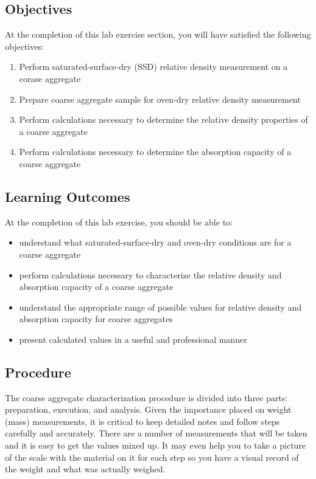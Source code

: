 \documentclass[12pt]{article}
\begin{document}
\subsection{Objectives}
\label{ssec:headingscap}
At the completion of this lab exercise section, you will have satisfied the following objectives:
\begin{enumerate}
    \item Perform saturated-surface-dry (SSD) relative density measurement on a corase aggregate
    \item Prepare coarse aggregate sample for oven-dry relative density measurement
    \item Perform calculations necessary to determine the relative density properties of a coarse aggregate
    \item Perform calculations necessary to determine the absorption capacity of a coarse aggregate
\end{enumerate}

\subsection{Learning Outcomes}
At the completion of this lab exercise, you should be able to:
\begin{itemize}
    \item understand what saturated-surface-dry and oven-dry conditions are for a coarse aggregate
    \item perform calculations necessary to characterize the relative density and absorption capacity of a coarse aggregate
    \item understand the appropriate range of possible values for relative density and absorption capacity for coarse aggregates
    \item present calculated values in a useful and professional manner
\end{itemize}

\pagebreak
\subsection{Procedure}
The coarse aggregate characterization procedure is divided into three parts: preparation, execution, and analysis. Given the importance placed on weight (mass) measurements, it is critical to keep detailed notes and follow steps carefully and accurately. There are a number of measurements that will be taken and it is easy to get the values mixed up. It may even help you to take a picture of the scale with the material on it for each step so you have a visual record of the weight and what was actually weighed.
\end{document}
